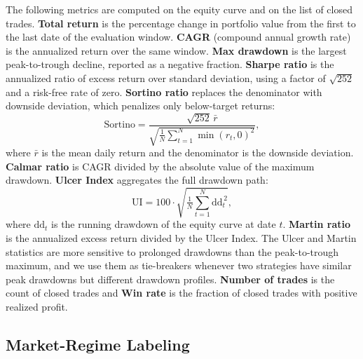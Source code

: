 \documentclass{ieeeaccess}
\begin{document}
The following metrics are computed on the equity curve and on the list of closed trades. \textbf{Total return} is the percentage change in portfolio value from the first to the last date of the evaluation window. \textbf{CAGR} (compound annual growth rate) is the annualized return over the same window. \textbf{Max drawdown} is the largest peak-to-trough decline, reported as a negative fraction. \textbf{Sharpe ratio} \cite{sharpe1966} is the annualized ratio of excess return over standard deviation, using a factor of $\sqrt{252}$ and a risk-free rate of zero. \textbf{Sortino ratio} \cite{sortino1994} replaces the denominator with downside deviation, which penalizes only below-target returns:
\begin{equation}
\mathrm{Sortino} = \frac{\sqrt{252}\,\bar{r}}{\sqrt{\tfrac{1}{N}\sum_{t=1}^{N}\min(r_t, 0)^2}},
\label{eq:sortino}
\end{equation}
where $\bar{r}$ is the mean daily return and the denominator is the downside deviation. \textbf{Calmar ratio} \cite{young1991} is CAGR divided by the absolute value of the maximum drawdown. \textbf{Ulcer Index} \cite{martin1989} aggregates the full drawdown path:
\begin{equation}
\mathrm{UI} = 100 \cdot \sqrt{\tfrac{1}{N}\sum_{t=1}^{N} \mathrm{dd}_t^{\,2}},
\label{eq:ulcer}
\end{equation}
where $\mathrm{dd}_t$ is the running drawdown of the equity curve at date $t$. \textbf{Martin ratio} \cite{martin1989} is the annualized excess return divided by the Ulcer Index. The Ulcer and Martin statistics are more sensitive to prolonged drawdowns than the peak-to-trough maximum, and we use them as tie-breakers whenever two strategies have similar peak drawdowns but different drawdown profiles. \textbf{Number of trades} is the count of closed trades and \textbf{Win rate} is the fraction of closed trades with positive realized profit.

\subsection{Market-Regime Labeling}
\label{subsec:regimes}
\end{document}
